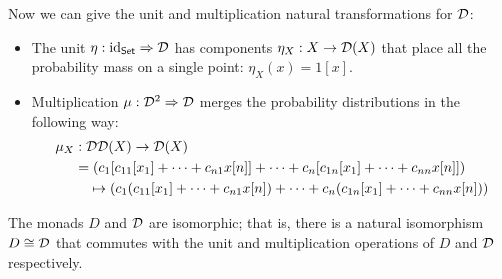 Now we can give the unit and multiplication natural transformations for $\mathcal D$:
\begin{itemize}
    \item The unit $\eta : \operatorname{id}_{\mathsf{Set}} \Rightarrow \mathcal D$ has components $\eta_X : X \to \mathcal D(X)$
    that place all the probability mass on a single point: $\eta_X(x) = 1[x]$.
    \item Multiplication $\mu : \mathcal D^2 \Rightarrow \mathcal D$ merges the probability 
    distributions in the following way: 
    \begin{align*}
        \mu_X &: \mathcal D\mathcal D(X) \to \mathcal D(X) \\
        &= (c_1[c_{11}[x_1] + \cdots + c_{n1}x[n]] + \cdots + c_n[c_{1n}[x_1] + \cdots + c_{nn}x[n]]) \\
        &\quad \mapsto
        (c_1(c_{11}[x_1] + \cdots + c_{n1}x[n]) + \cdots + c_n(c_{1n}[x_1] + \cdots + c_{nn}x[n]))
    \end{align*}
\end{itemize}

\begin{proposition}
  The monads \(D\) and \(\mathcal D\) are isomorphic;
  that is, there is a natural isomorphism \(D \cong \mathcal D\)
  that commutes with the unit and multiplication operations of \(D\) and \(\mathcal D\) respectively.
\end{proposition}

